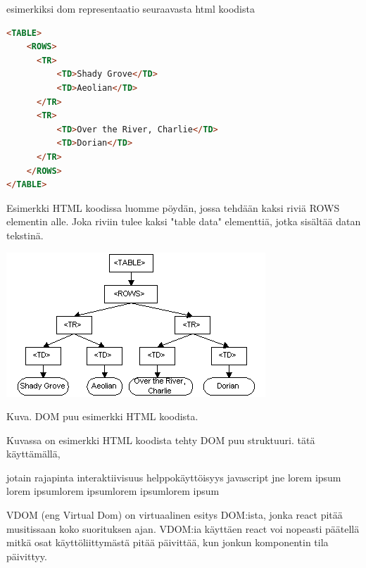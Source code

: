 esimerkiksi dom representaatio seuraavasta html koodista

    
\begin{tcolorbox}
\begin{lstlisting}[language=html]
<TABLE>
    <ROWS> 
      <TR> 
          <TD>Shady Grove</TD>
          <TD>Aeolian</TD> 
      </TR> 
      <TR>
          <TD>Over the River, Charlie</TD>
          <TD>Dorian</TD> 
      </TR> 
    </ROWS>
</TABLE>
\end{lstlisting}
\end{tcolorbox}


Esimerkki HTML koodissa luomme pöydän, jossa tehdään kaksi riviä ROWS elementin alle. 
Joka riviin tulee kaksi "table data"{} elementtiä, jotka sisältää datan tekstinä.
\bigskip



\includegraphics{./src/public/oppar/dom.png}

Kuva\getImgCount .{} DOM puu esimerkki HTML koodista. 
\medskip

Kuvassa \theimgCounter {} on esimerkki HTML koodista tehty DOM puu struktuuri.
tätä käyttämällä, 

jotain rajapinta interaktiivisuus helppokäyttöisyys javascript jne lorem ipsum lorem ipsumlorem ipsumlorem ipsumlorem ipsum

\bigskip




%

VDOM (eng Virtual Dom) on virtuaalinen esitys DOM:ista, jonka react pitää musitissaan koko suorituksen ajan.
VDOM:ia käyttäen react voi nopeasti päätellä mitkä osat käyttöliittymästä pitää päivittää, kun jonkun komponentin tila päivittyy. 
\medskip



